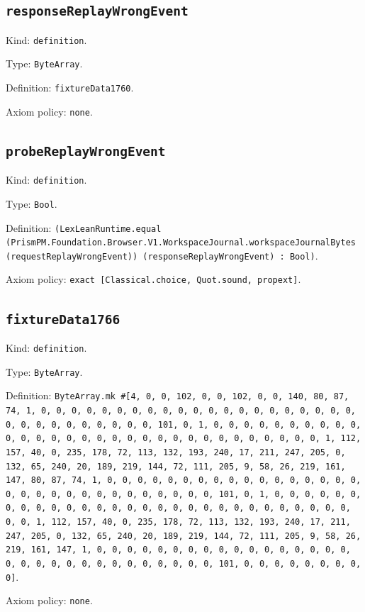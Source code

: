 \documentclass[11pt]{article}
\begin{document}
\subsection*{\texttt{responseReplayWrongEvent}}
\noindent Kind: \texttt{definition}.\par
\noindent Type: \texttt{ByteArray}.\par
\noindent Definition: \texttt{fixtureData1760}.\par
\noindent Axiom policy: \texttt{none}.\par
\subsection*{\texttt{probeReplayWrongEvent}}
\noindent Kind: \texttt{definition}.\par
\noindent Type: \texttt{Bool}.\par
\noindent Definition: \texttt{(LexLeanRuntime.equal (PrismPM.Foundation.Browser.V1.WorkspaceJournal.workspaceJournalBytes (requestReplayWrongEvent)) (responseReplayWrongEvent) : Bool)}.\par
\noindent Axiom policy: \texttt{exact [Classical.choice, Quot.sound, propext]}.\par
\subsection*{\texttt{fixtureData1766}}
\noindent Kind: \texttt{definition}.\par
\noindent Type: \texttt{ByteArray}.\par
\noindent Definition: \texttt{ByteArray.mk \#[4, 0, 0, 102, 0, 0, 102, 0, 0, 140, 80, 87, 74, 1, 0, 0, 0, 0, 0, 0, 0, 0, 0, 0, 0, 0, 0, 0, 0, 0, 0, 0, 0, 0, 0, 0, 0, 0, 0, 0, 0, 0, 0, 0, 0, 101, 0, 1, 0, 0, 0, 0, 0, 0, 0, 0, 0, 0, 0, 0, 0, 0, 0, 0, 0, 0, 0, 0, 0, 0, 0, 0, 0, 0, 0, 0, 0, 0, 0, 1, 112, 157, 40, 0, 235, 178, 72, 113, 132, 193, 240, 17, 211, 247, 205, 0, 132, 65, 240, 20, 189, 219, 144, 72, 111, 205, 9, 58, 26, 219, 161, 147, 80, 87, 74, 1, 0, 0, 0, 0, 0, 0, 0, 0, 0, 0, 0, 0, 0, 0, 0, 0, 0, 0, 0, 0, 0, 0, 0, 0, 0, 0, 0, 0, 0, 0, 0, 101, 0, 1, 0, 0, 0, 0, 0, 0, 0, 0, 0, 0, 0, 0, 0, 0, 0, 0, 0, 0, 0, 0, 0, 0, 0, 0, 0, 0, 0, 0, 0, 0, 0, 1, 112, 157, 40, 0, 235, 178, 72, 113, 132, 193, 240, 17, 211, 247, 205, 0, 132, 65, 240, 20, 189, 219, 144, 72, 111, 205, 9, 58, 26, 219, 161, 147, 1, 0, 0, 0, 0, 0, 0, 0, 0, 0, 0, 0, 0, 0, 0, 0, 0, 0, 0, 0, 0, 0, 0, 0, 0, 0, 0, 0, 0, 0, 0, 0, 101, 0, 0, 0, 0, 0, 0, 0, 0, 0]}.\par
\noindent Axiom policy: \texttt{none}.\par
\end{document}
